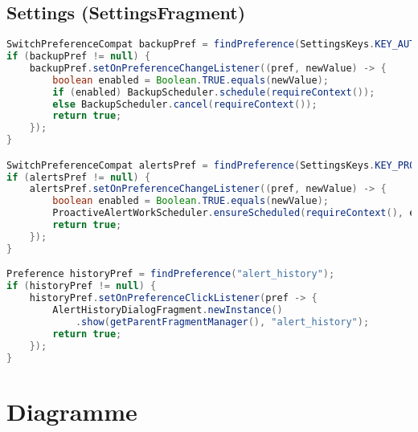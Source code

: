 \documentclass[14pt,a4paper]{report}
\begin{document}
\subsection*{Settings (SettingsFragment)}
\begin{lstlisting}[language=Java, caption={SettingsFragment.java (Auszug)}]
SwitchPreferenceCompat backupPref = findPreference(SettingsKeys.KEY_AUTO_BACKUP);
if (backupPref != null) {
    backupPref.setOnPreferenceChangeListener((pref, newValue) -> {
        boolean enabled = Boolean.TRUE.equals(newValue);
        if (enabled) BackupScheduler.schedule(requireContext());
        else BackupScheduler.cancel(requireContext());
        return true;
    });
}

SwitchPreferenceCompat alertsPref = findPreference(SettingsKeys.KEY_PROACTIVE_ALERTS_ENABLED);
if (alertsPref != null) {
    alertsPref.setOnPreferenceChangeListener((pref, newValue) -> {
        boolean enabled = Boolean.TRUE.equals(newValue);
        ProactiveAlertWorkScheduler.ensureScheduled(requireContext(), enabled);
        return true;
    });
}

Preference historyPref = findPreference("alert_history");
if (historyPref != null) {
    historyPref.setOnPreferenceClickListener(pref -> {
        AlertHistoryDialogFragment.newInstance()
            .show(getParentFragmentManager(), "alert_history");
        return true;
    });
}
\end{lstlisting}


\section{Diagramme}

\usetikzlibrary{positioning, calc, shapes.geometric, arrows.meta}

\end{document}
